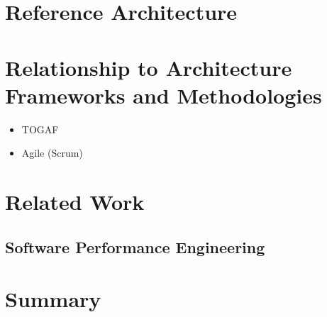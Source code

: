 
\section{Reference Architecture}

\section{Relationship to Architecture Frameworks and Methodologies} %
\label{sec:ch6_relation_frameworks}

\begin{itemize}
	\item TOGAF
	\item Agile (Scrum)
\end{itemize}


\section{Related Work}

\subsection{Software Performance Engineering} %
\label{sub:software_performance_engineering}


\section{Summary} 
